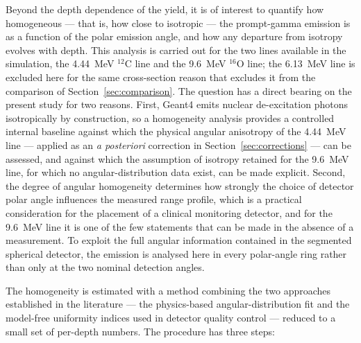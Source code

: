 \documentclass[a4paper]{article}
\begin{document}
Beyond the depth dependence of the yield, it is of interest to quantify how homogeneous — that is, how close to isotropic — the prompt-gamma emission is as a function of the polar emission angle, and how any departure from isotropy evolves with depth. This analysis is carried out for the two lines available in the simulation, the 4.44~MeV $^{12}$C line and the 9.6~MeV $^{16}$O line; the 6.13~MeV line is excluded here for the same cross-section reason that excludes it from the comparison of Section~\ref{sec:comparison}. The question has a direct bearing on the present study for two reasons. First, Geant4 emits nuclear de-excitation photons isotropically by construction, so a homogeneity analysis provides a controlled internal baseline against which the physical angular anisotropy of the 4.44~MeV line — applied as an \emph{a posteriori} correction in Section~\ref{sec:corrections} — can be assessed, and against which the assumption of isotropy retained for the 9.6~MeV line, for which no angular-distribution data exist, can be made explicit. Second, the degree of angular homogeneity determines how strongly the choice of detector polar angle influences the measured range profile, which is a practical consideration for the placement of a clinical monitoring detector, and for the 9.6~MeV line it is one of the few statements that can be made in the absence of a measurement. To exploit the full angular information contained in the segmented spherical detector, the emission is analysed here in every polar-angle ring rather than only at the two nominal detection angles.

The homogeneity is estimated with a method combining the two approaches established in the literature — the physics-based angular-distribution fit and the model-free uniformity indices used in detector quality control — reduced to a small set of per-depth numbers. The procedure has three steps:
\end{document}
